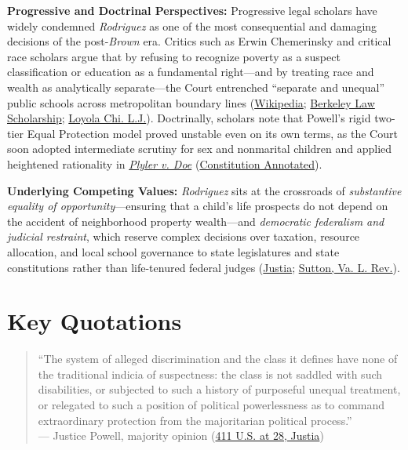 \documentclass[12pt]{article}
\begin{document}
\textbf{Progressive and Doctrinal Perspectives:} Progressive legal scholars have widely condemned \textit{Rodriguez} as one of the most consequential and damaging decisions of the post-\textit{Brown} era. Critics such as Erwin Chemerinsky and critical race scholars argue that by refusing to recognize poverty as a suspect classification or education as a fundamental right---and by treating race and wealth as analytically separate---the Court entrenched ``separate and unequal'' public schools across metropolitan boundary lines (\href{https://en.wikipedia.org/wiki/San_Antonio_Independent_School_District_v._Rodriguez}{Wikipedia}; \href{https://lawcat.berkeley.edu/record/1124439/files/fulltext.pdf}{Berkeley Law Scholarship}; \href{https://loyola-chicago-law-journal.scholasticahq.com/article/92496-_san-antonio-independent-school-district-v-rodriguez_-at-fifty-contingencies-consequences-and-calls-to-action/attachment/193053.pdf}{Loyola Chi. L.J.}). Doctrinally, scholars note that Powell's rigid two-tier Equal Protection model proved unstable even on its own terms, as the Court soon adopted intermediate scrutiny for sex and nonmarital children and applied heightened rationality in \href{https://www.law.cornell.edu/supremecourt/text/457/202}{\textit{Plyler v. Doe}} (\href{https://www.law.cornell.edu/constitution-conan/amendment-14/section-1/educational-opportunity}{Constitution Annotated}).

\textbf{Underlying Competing Values:} \textit{Rodriguez} sits at the crossroads of \emph{substantive equality of opportunity}---ensuring that a child's life prospects do not depend on the accident of neighborhood property wealth---and \emph{democratic federalism and judicial restraint}, which reserve complex decisions over taxation, resource allocation, and local school governance to state legislatures and state constitutions rather than life-tenured federal judges (\href{https://supreme.justia.com/cases/federal/us/411/1/}{Justia}; \href{https://www.virginialawreview.org/wp-content/uploads/2020/12/1963-1.pdf}{Sutton, Va. L. Rev.}).

\section{Key Quotations}

\begin{quote}
``The system of alleged discrimination and the class it defines have none of the traditional indicia of suspectness: the class is not saddled with such disabilities, or subjected to such a history of purposeful unequal treatment, or relegated to such a position of political powerlessness as to command extraordinary protection from the majoritarian political process.'' \\
--- Justice Powell, majority opinion (\href{https://supreme.justia.com/cases/federal/us/411/1/}{411 U.S. at 28, Justia})
\end{quote}
\end{document}
